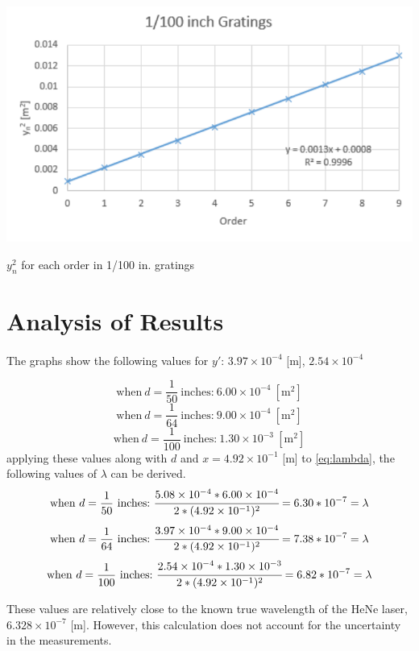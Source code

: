 \documentclass{article}
\begin{document}
\begin{graph}
  \includegraphics[width=\textwidth]{img/100.pdf}
  \caption{$y_{n}^{2}$ for each order in 1/100 in. gratings}
  \label{g:100}
\end{graph}

\section{Analysis of Results}
\paragraph{}

The graphs show the following values for $y'$:
$3.97 \times 10^{-4}$ [m], $2.54 \times 10^{-4}$

$$
\text{when}~d=\frac{1}{50}~\text{inches:}~6.00 \times 10^{-4}~[\text{m}^2]
$$
$$
\text{when}~d=\frac{1}{64}~\text{inches:}~9.00 \times 10^{-4}~[\text{m}^2]
$$
$$
\text{when}~d=\frac{1}{100}~\text{inches:}~1.30 \times 10^{-3}~[\text{m}^2]
$$
applying these values along with $d$ and $x = 4.92 \times 10^{-1}$ [m] to \eqref{eq:lambda}, the following values of $\lambda$ can be derived.
$$
\text{when}~d=\frac{1}{50}~\text{inches:}~\cfrac{5.08 \times 10^{-4} * 6.00 \times 10^{-4}}{2*(4.92 \times 10^{-1})^2} = 6.30 * 10^{-7} = \lambda
$$
$$
\text{when}~d=\frac{1}{64}~\text{inches:}~\cfrac{3.97 \times 10^{-4} * 9.00 \times 10^{-4}}{2*(4.92 \times 10^{-1})^2} = 7.38 * 10^{-7} = \lambda
$$
$$
\text{when}~d=\frac{1}{100}~\text{inches:}~\cfrac{2.54 \times 10^{-4} * 1.30 \times 10^{-3}}{2*(4.92 \times 10^{-1})^2} = 6.82 * 10^{-7} = \lambda
$$

These values are relatively close to the known true wavelength of the HeNe laser, $6.328 \times 10^{-7}$ [m]. However, this calculation does not account for the uncertainty in the measurements.
\end{document}
